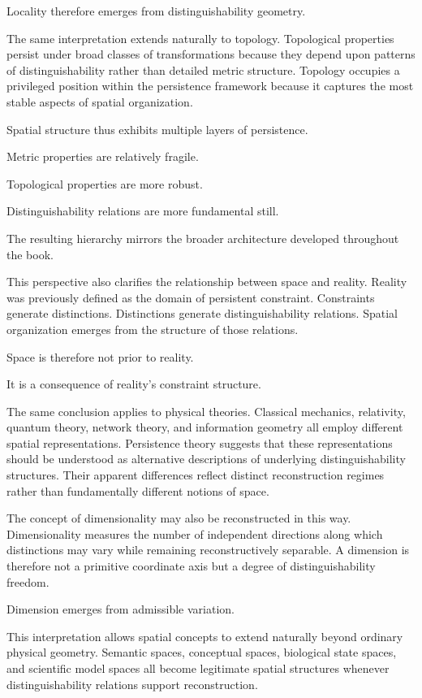 \documentclass[12pt,oneside]{article}
\theoremstyle{definition}
\begin{document}
Locality therefore emerges from distinguishability geometry.

The same interpretation extends naturally to topology. Topological properties persist under broad classes of transformations because they depend upon patterns of distinguishability rather than detailed metric structure. Topology occupies a privileged position within the persistence framework because it captures the most stable aspects of spatial organization.

Spatial structure thus exhibits multiple layers of persistence.

Metric properties are relatively fragile.

Topological properties are more robust.

Distinguishability relations are more fundamental still.

The resulting hierarchy mirrors the broader architecture developed throughout the book.

This perspective also clarifies the relationship between space and reality. Reality was previously defined as the domain of persistent constraint. Constraints generate distinctions. Distinctions generate distinguishability relations. Spatial organization emerges from the structure of those relations.

Space is therefore not prior to reality.

It is a consequence of reality's constraint structure.

The same conclusion applies to physical theories. Classical mechanics, relativity, quantum theory, network theory, and information geometry all employ different spatial representations. Persistence theory suggests that these representations should be understood as alternative descriptions of underlying distinguishability structures. Their apparent differences reflect distinct reconstruction regimes rather than fundamentally different notions of space.

The concept of dimensionality may also be reconstructed in this way. Dimensionality measures the number of independent directions along which distinctions may vary while remaining reconstructively separable. A dimension is therefore not a primitive coordinate axis but a degree of distinguishability freedom.

Dimension emerges from admissible variation.

This interpretation allows spatial concepts to extend naturally beyond ordinary physical geometry. Semantic spaces, conceptual spaces, biological state spaces, and scientific model spaces all become legitimate spatial structures whenever distinguishability relations support reconstruction.
\end{document}
